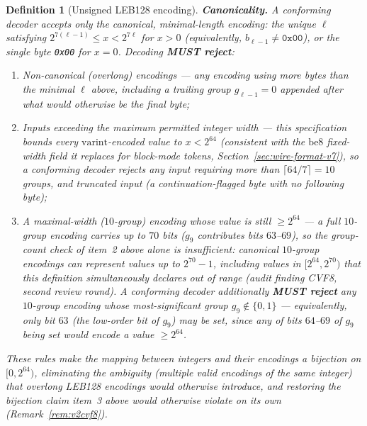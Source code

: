 \documentclass[11pt,a4paper]{article}
\newtheorem{definition}[theorem]{Definition}
\begin{document}
\begin{definition}[Unsigned LEB128 encoding]
\textbf{Canonicality.} A conforming decoder accepts \emph{only} the
canonical, minimal-length encoding: the unique $\ell$ satisfying
$2^{7(\ell-1)} \leq x < 2^{7\ell}$ for $x>0$ (equivalently, $b_{\ell-1} \neq
\texttt{0x00}$), or the single byte \texttt{0x00} for $x=0$. Decoding
\textbf{MUST reject}:
\begin{enumerate}
  \item \emph{Non-canonical (overlong) encodings} --- any encoding using
        more bytes than the minimal $\ell$ above, including a trailing
        group $g_{\ell-1} = 0$ appended after what would otherwise be the
        final byte;
  \item \emph{Inputs exceeding the maximum permitted integer width} ---
        this specification bounds every $\mathrm{varint}$-encoded value to
        $x < 2^{64}$ (consistent with the $\mathrm{be8}$ fixed-width field
        it replaces for block-mode tokens, Section~\ref{sec:wire-format-v7}),
        so a conforming decoder rejects any input requiring more than
        $\lceil 64/7 \rceil = 10$ groups, and truncated input (a
        continuation-flagged byte with no following byte);
  \item \emph{A maximal-width ($10$-group) encoding whose value is still
        $\geq 2^{64}$} --- a full $10$-group encoding carries up to $70$
        bits ($g_9$ contributes bits $63$--$69$), so the group-count check
        of item~2 above alone is insufficient: canonical $10$-group
        encodings can represent values up to $2^{70}-1$, including values
        in $[2^{64}, 2^{70})$ that this definition simultaneously declares
        out of range (audit finding CVF8, second review round). A
        conforming decoder additionally \textbf{MUST reject} any
        $10$-group encoding whose most-significant group $g_9 \notin
        \{0,1\}$ --- equivalently, only bit $63$ (the low-order bit of
        $g_9$) may be set, since any of bits $64$--$69$ of $g_9$ being set
        would encode a value $\geq 2^{64}$.
\end{enumerate}
These rules make the mapping between integers and their encodings a
bijection on $[0, 2^{64})$, eliminating the ambiguity (multiple valid
encodings of the same integer) that overlong LEB128 encodings would
otherwise introduce, and restoring the bijection claim item~3 above would
otherwise violate on its own (Remark~\ref{rem:v2cvf8}).
\end{definition}
\end{document}
